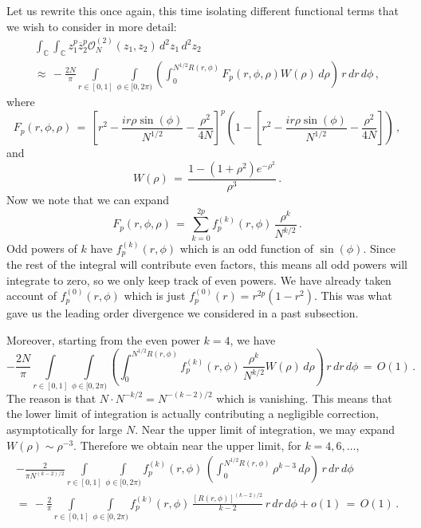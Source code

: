 \documentclass[12pt]{report}
\newcommand{\C}{\mathbb{C}}
\newcommand{\be}{\begin{equation}}
\newcommand{\ee}{\end{equation}}
\theoremstyle{definition}
\begin{document}
Let us rewrite this once again, this time isolating different functional terms that we wish to consider in more detail:
\begin{multline}
\int_{\C} \int_{\C} z_1^p \overline{z}_2^p \mathcal{O}_N^{(2)}(z_1,z_2)\, d^2z_1\, d^2z_2\, \\ \approx\, -\frac{2N}{\pi} \int\limits_{r \in [0,1]} \int\limits_{\phi \in [0,2\pi)} \left(\int_0^{N^{1/2}R(r,\phi)} F_p(r,\phi,\rho) W(\rho)\, d\rho\right)\, r\, dr\, d\phi\, ,
\end{multline}
where
\be
\label{eq:Fp}
F_p(r,\phi,\rho)\, =\, \left[r^2 - \frac{i r\rho \sin(\phi)}{N^{1/2}} - \frac{\rho^2}{4N}\right]^p
\left(1 -  \left[r^2 - \frac{i r\rho \sin(\phi)}{N^{1/2}} - \frac{\rho^2}{4N}\right]\right)\, ,
\ee
and
\be
W(\rho)\, =\,  \frac{1-(1+\rho^2)e^{-\rho^2}}{\rho^3}\, .
\ee
Now we note that we can expand
\be
\label{eq:expand}
F_p(r,\phi,\rho)\, =\, \sum_{k=0}^{2p} f_p^{(k)}(r,\phi)\, \frac{\rho^k}{N^{k/2}}\, .
\ee
Odd powers of $k$ have $f_p^{(k)}(r,\phi)$ which is an odd function of $\sin(\phi)$. Since the rest of the integral will contribute even factors, this means all odd powers will integrate to zero,
so we only keep track of even powers.
We have already taken account of $f_p^{(0)}(r,\phi)$ which is just $f_p^{(0)}(r) = r^{2p} (1-r^2)$.
This was what gave us the leading order divergence we considered in a past subsection.

Moreover, starting from the even power $k=4$, we have
\be
-\frac{2N}{\pi} \int\limits_{r \in [0,1]} \int\limits_{\phi \in [0,2\pi)} \left(\int_0^{N^{1/2}R(r,\phi)} f_p^{(k)}(r,\phi)\, \frac{\rho^k}{N^{k/2}} W(\rho)\, d\rho\right)\, r\, dr\, d\phi\, 
=\, O(1)\, .
\ee
The reason is that $N \cdot N^{-k/2} = N^{-(k-2)/2}$ which is vanishing. This means that the lower limit of integration is actually contributing a negligible correction, asymptotically for large $N$.
Near the upper limit of integration, we may expand $W(\rho) \sim \rho^{-3}$.
Therefore we obtain near the upper limit, for $k=4,6,\dots$,
\begin{multline}
\label{eq:largek}
-\frac{2}{\pi N^{(k-2)/2}} \int\limits_{r \in [0,1]} \int\limits_{\phi \in [0,2\pi)} f_p^{(k)}(r,\phi)\,\left(\int_0^{N^{1/2}R(r,\phi)}  \rho^{k-3}\, d\rho\right)\, r\, dr\, d\phi\\
=\, -\frac{2}{\pi} \int\limits_{r \in [0,1]} \int\limits_{\phi \in [0,2\pi)} f_p^{(k)}(r,\phi)\, \frac{[R(r,\phi)]^{(k-2)/2}}{k-2}\, r\, dr\, d\phi
+o(1)\, =\, O(1)\, .
\end{multline}
\end{document}
